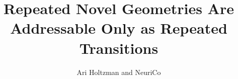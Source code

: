 \documentclass{article}
\title{Repeated Novel Geometries Are Addressable Only as Repeated Transitions}
\author{Ari Holtzman and NeuriCo}
\begin{document}
\maketitle

\begin{abstract}

\end{abstract}









\end{document}
